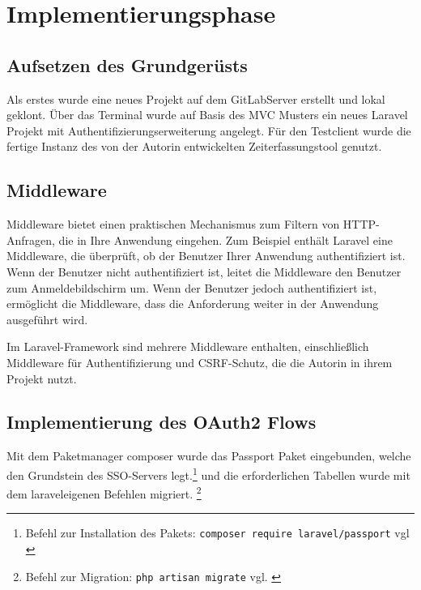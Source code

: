 \section{Implementierungsphase} 
\label{sec:Implementierungsphase}

\subsection{Aufsetzen des Grundgerüsts}
\label{sec:AufsetzenGrundgeruest}

Als erstes wurde eine neues Projekt auf dem GitLabServer erstellt und lokal geklont. Über das Terminal wurde auf Basis des MVC Musters ein neues Laravel Projekt mit Authentifizierungserweiterung angelegt. 
Für den Testclient wurde die fertige Instanz des von der Autorin entwickelten Zeiterfassungstool genutzt.

\subsection{Middleware}
\label{sec:Middleware}

Middleware bietet einen praktischen Mechanismus zum Filtern von HTTP-Anfragen, die in Ihre Anwendung eingehen. Zum Beispiel enthält Laravel eine Middleware, die überprüft, ob der Benutzer Ihrer Anwendung authentifiziert ist. Wenn der Benutzer nicht authentifiziert ist, leitet die Middleware den Benutzer zum Anmeldebildschirm um. Wenn der Benutzer jedoch authentifiziert ist, ermöglicht die Middleware, dass die Anforderung weiter in der Anwendung ausgeführt wird.

Im Laravel-Framework sind mehrere Middleware enthalten, einschließlich Middleware für Authentifizierung und \acs{CSRF}-Schutz, die die Autorin in ihrem Projekt nutzt. 

\subsection{Implementierung des OAuth2 Flows}
\label{sec:ImplementierungOAuth2}

Mit dem Paketmanager composer wurde das Passport Paket eingebunden, welche den Grundstein des SSO-Servers legt.\footnote{Befehl zur Installation des Pakets: \texttt{composer require laravel/passport} vgl \cite{composer}} und die erforderlichen Tabellen wurde mit dem laraveleigenen Befehlen migriert. \footnote{Befehl zur Migration: \texttt{php artisan migrate} vgl. \cite{Laravel}}

